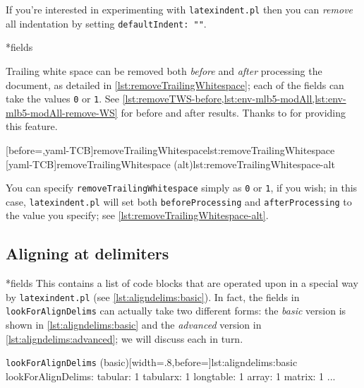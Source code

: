  If you're interested in experimenting with \texttt{latexindent.pl} then you can
 \emph{remove} all indentation by setting \texttt{defaultIndent: ""}.

*{fields}\label{yaml:removeTrailingWhitespace}

 Trailing white space can be removed both \emph{before} and \emph{after} processing the
 document, as detailed in \cref{lst:removeTrailingWhitespace}; each of the fields can
 take the values \texttt{0} or \texttt{1}. See
 \vref{lst:removeTWS-before,lst:env-mlb5-modAll,lst:env-mlb5-modAll-remove-WS} for before
 and after results. Thanks to \cite{vosskuhle} for providing this feature.

 \begin{cmhtcbraster}
  [before=\centering,yaml-TCB]{removeTrailingWhitespace}{lst:removeTrailingWhitespace}
  [yaml-TCB]{removeTrailingWhitespace (alt)}{lst:removeTrailingWhitespace-alt}
 \end{cmhtcbraster}

 You can specify \texttt{removeTrailingWhitespace} simply as \texttt{0} or \texttt{1}, if
 you wish; in this case, 
 \texttt{latexindent.pl} will set both \texttt{beforeProcessing} and
 \texttt{afterProcessing} to the value you specify; see
 \cref{lst:removeTrailingWhitespace-alt}.%

\subsection{Aligning at delimiters}\label{subsec:align-at-delimiters}
*{fields}
 This contains a list of code blocks that are operated upon in a special way by
 \texttt{latexindent.pl} (see \cref{lst:aligndelims:basic}). In fact, the fields in
 \texttt{lookForAlignDelims} can actually take two different forms: the \emph{basic}
 version is shown in \cref{lst:aligndelims:basic} and the \emph{advanced} version in
 \cref{lst:aligndelims:advanced}; we will discuss each in turn.

 \begin{yaml}[numbers=none]{\texttt{lookForAlignDelims} (basic)}[width=.8\linewidth,before=\centering]{lst:aligndelims:basic}
lookForAlignDelims:
   tabular: 1
   tabularx: 1
   longtable: 1
   array: 1
   matrix: 1
   ...
	\end{yaml}

